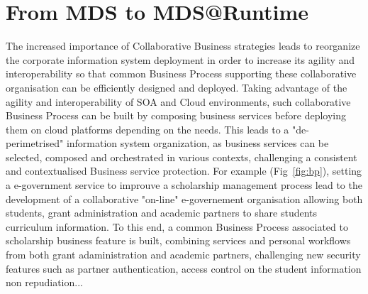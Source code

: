 \documentclass[runningheads,a4paper]{llncs}
\begin{document}
\section{From MDS to MDS@Runtime}
The increased importance of Collaborative Business strategies leads to reorganize the corporate information system deployment in order to increase its agility and interoperability so that common Business Process supporting these collaborative organisation can be efficiently designed and deployed. Taking advantage of the agility and interoperability of SOA and Cloud environments, such collaborative Business Process can be built by composing business services before deploying them on cloud platforms depending on the needs. This leads to a "de-perimetrised" information system organization, as business services can be selected,  composed and orchestrated in various contexts, challenging a consistent and contextualised Business service protection.
For example (Fig~\ref{fig:bp}), setting a e-government service to improuve a scholarship management process
 lead to the development of a collaborative "on-line" e-governement organisation allowing both students, grant administration and academic partners to share students curriculum information. To this end, a common Business Process associated to scholarship business feature is built, combining services and personal workflows from both grant adaministration and academic partners, challenging new security features such as partner authentication, access control on the student information non repudiation...  
\end{document}
